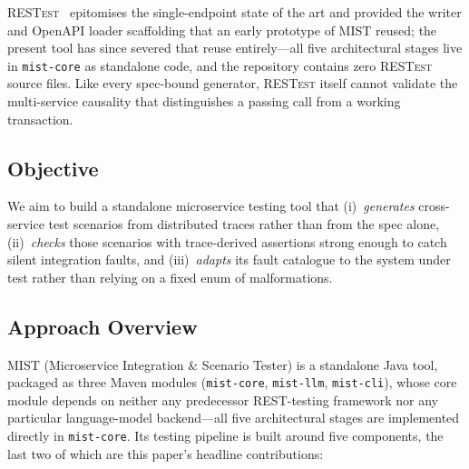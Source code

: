 \documentclass[conference]{IEEEtran}
\begin{document}
\textsc{RESTest}~\cite{martin2019restest} epitomises the single-endpoint
state of the art and provided the writer and OpenAPI loader scaffolding
that an early prototype of \textsc{MIST} reused; the present tool has
since severed that reuse entirely---all five architectural stages live
in \texttt{mist-core} as standalone code, and the repository contains
zero \textsc{RESTest} source files.  Like every spec-bound generator,
\textsc{RESTest} itself cannot validate the multi-service causality that
distinguishes a passing call from a working transaction.

\subsection*{Objective}
We aim to build a standalone microservice testing tool that
(i)~\emph{generates} cross-service test scenarios from distributed traces
rather than from the spec alone, (ii)~\emph{checks} those scenarios with
trace-derived assertions strong enough to catch silent integration
faults, and (iii)~\emph{adapts} its fault catalogue to the system under
test rather than relying on a fixed enum of malformations.

\subsection*{Approach Overview}
\textsc{MIST} (Microservice Integration \& Scenario Tester) is a
standalone Java tool, packaged as three Maven modules
(\texttt{mist-core}, \texttt{mist-llm}, \texttt{mist-cli}), whose core
module depends on neither any predecessor REST-testing framework nor any
particular language-model backend---all five architectural stages are
implemented directly in \texttt{mist-core}.  Its testing pipeline is built around
five components, the last two of which are this paper's headline
contributions:
\end{document}
